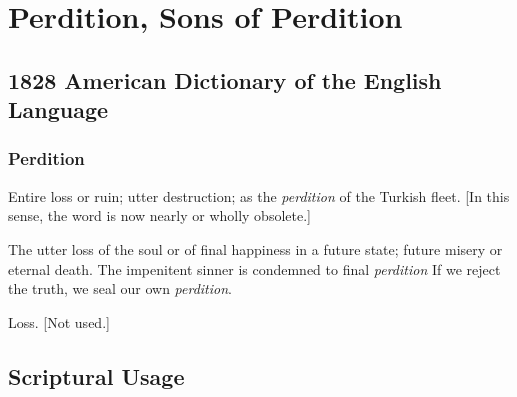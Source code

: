 \section{Perdition, Sons of Perdition}
	\label{SONSOFPERDITION}
	\label{PERDITION}
	

\subsection{1828 American Dictionary of the English Language} %
	\label{SONSOFPERDITION-1828}

	\subsubsection{Perdition}

		\begin{compactitem}
			\item[1] Entire loss or ruin; utter destruction; as the \textit{perdition} of the Turkish fleet. [In this sense, the word is now nearly or wholly obsolete.]
			\item[2] The utter loss of the soul or of final happiness in a future state; future misery or eternal death. The impenitent sinner is condemned to final \textit{perdition} If we reject the truth, we seal our own \textit{perdition}.
			\item[3] Loss. [Not used.]
		\end{compactitem}



\subsection{Scriptural Usage} %
	\label{SONSOFPERDITION-SCRIPTURES}

